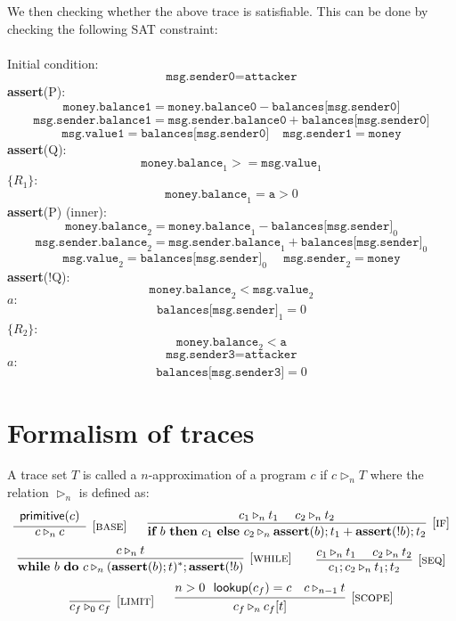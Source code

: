 \documentclass[runningheads]{llncs}
\newcommand{\ifs}[3]{\textbf{if}~#1~\textbf{then}~#2~\textbf{else}~#3}
\newcommand{\whiles}[2]{\textbf{while}~#1~\textbf{do}~#2}
\newcommand{\trans}{\triangleright}
\newcommand{\rname}[1]{\textsc{#1}}
\begin{document}
We then checking whether the above trace is satisfiable. This can be done by checking the following SAT constraint:
\\
\\
Initial condition:
$$
\texttt{msg.sender0} = \texttt{attacker}
$$
\textbf{assert}(P):
$$
\texttt{money.balance1} = \texttt{money.balance0} - \texttt{balances[msg.sender0]}
$$
$$
\texttt{msg.sender.balance1} =  \texttt{msg.sender.balance0} + \texttt{balances[msg.sender0]}
$$
$$
\texttt{msg.value1} = \texttt{balances[msg.sender0]}
~~~~~
\texttt{msg.sender1} = \texttt{money}
$$
\textbf{assert}(Q):
$$
\texttt{money.balance}_1 >= \texttt{msg.value}_1
$$
$\{R_1\}$:
$$
\texttt{money.balance}_1 = \texttt{a}  > 0
$$
\textbf{assert}(P) (inner):
$$
\texttt{money.balance}_2 = \texttt{money.balance}_1 - \texttt{balances[msg.sender]}_0
$$
$$
\texttt{msg.sender.balance}_2 =  \texttt{msg.sender.balance}_1 + \texttt{balances[msg.sender]}_0
$$
$$
\texttt{msg.value}_2 = \texttt{balances[msg.sender]}_0~~~~~~
\texttt{msg.sender}_2 = \texttt{money}
$$
\textbf{assert}(!Q):
$$
\texttt{money.balance}_2 < \texttt{msg.value}_2
$$
$a:$
$$
\texttt{balances[msg.sender]}_1 = 0
$$
$\{R_2\}$:
$$
\texttt{money.balance}_2 < \texttt{a}
$$
$$
\texttt{msg.sender3} = \texttt{attacker}
$$
$a:$
$$
\texttt{balances[msg.sender3]} = 0
$$



\section{Formalism of traces}

\begin{definition}
A trace set $T$ is called a $n$-approximation of a program $c$ if $c\triangleright_{n}T$ where the relation $\triangleright_{n}$ is defined as:
$$
\infer[{[\rname{base}]}]{c \trans_{n} c}{
	\begin{array}{c}
	\textsf{primitive}(c)
	\end{array}}
~~~~~
\infer[{[\rname{if}]}]{\ifs{b}{c_1}{c_2} \trans_{n} \textbf{assert}(b);t_1+\textbf{assert}(!b);t_2}{c_1 \trans_{n} t_1~~~~ c_2 \trans_{n} t_2}
$$
$$
\infer[{[\rname{while}]}]{\whiles{b}{c} \trans_{n} (\textbf{assert}(b);t)^*;\textbf{assert}(!b)}{c \trans_{n} t}
~~~~~~
\infer[{[\rname{seq}]}]{c_1;c_2 \trans_{n} t_1 ; t_2}{c_1 \trans_{n} t_1~~~~ c_2 \trans_{n} t_2}
$$
$$
\infer[{[\rname{limit}]}]{c_f \trans_{0} c_f}{}~~~~~
\infer[{[\rname{scope}]}]{c_f \trans_{n} c_f[t]}{n > 0~~\textsf{lookup}(c_f) = c~~~c \trans_{n-1} t}
$$	
\end{definition}
\end{document}
